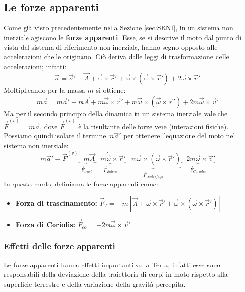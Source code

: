 \documentclass[11pt, a4paper, openright]{book}
\theoremstyle{plain}
\theoremstyle{definition}
\begin{document}
\subsection{Le forze apparenti}
Come già visto precedentemente nella Sezione \ref{sec:SRNI}, in un sistema non inerziale agiscono le \textbf{forze apparenti}. Esse, se si descrive il moto dal punto di vista del sistema di riferimento non inerziale, hanno segno opposto alle accelerazioni che le originano. Ciò deriva dalle leggi di trasformazione delle accelerazioni; infatti:
\begin{equation*}
    \vec{a} = \vec{a}' + \vec{A} + \dot{\vec{\omega}}\times\vec{r}' + \vec{\omega} \times (\vec{\omega} \times \vec{r}') + 2\vec{\omega} \times \vec{v}'
\end{equation*}
Moltiplicando per la massa $m$ si ottiene:
\begin{equation*}
    m\vec{a} = m\vec{a}' + m\vec{A} + m\dot{\vec{\omega}}\times\vec{r}' + m\vec{\omega} \times (\vec{\omega} \times \vec{r}') + 2m\vec{\omega} \times \vec{v}'
\end{equation*}
Ma per il secondo principio della dinamica in un sistema inerziale vale che $\vec{F}^{(v)} = m\vec{a}$, dove $\vec{F}^{(v)}$ è la risultante delle forze vere (interazioni fisiche). Possiamo quindi isolare il termine $m\vec{a}'$ per ottenere l'equazione del moto nel sistema non inerziale:
\begin{equation*}
    m\vec{a}' = \vec{F}^{(v)} \underbrace{- m\vec{A}}_{\vec{F}_{trasl}} \underbrace{- m\dot{\vec{\omega}}\times\vec{r}'}_{\vec{F}_{Eulero}} \underbrace{- m\vec{\omega} \times (\vec{\omega} \times \vec{r}')}_{\vec{F}_{centrifuga}} \underbrace{- 2m\vec{\omega} \times \vec{v}'}_{\vec{F}_{Coriolis}}
\end{equation*}
In questo modo, definiamo le forze apparenti come:
\begin{itemize}
    \item \textbf{Forza di trascinamento:} $\vec{F}_{T} = -m[\vec{A} + \dot{\vec{\omega}}\times\vec{r}' + \vec{\omega} \times (\vec{\omega} \times \vec{r}')]$
    \item \textbf{Forza di Coriolis:} $\vec{F}_{co} = -2m\vec{\omega} \times \vec{v}'$
\end{itemize}

\subsubsection{Effetti delle forze apparenti}
Le forze apparenti hanno effetti importanti sulla Terra, infatti esse sono responsabili della deviazione della traiettoria di corpi in moto rispetto alla superficie terrestre e della variazione della gravità percepita. 
\end{document}
